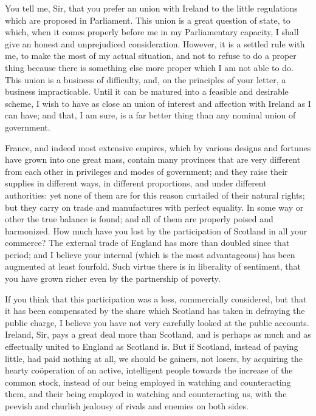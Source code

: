 You tell me, Sir, that you prefer an union with Ireland to the little regulations which are proposed in Parliament. This union is a great question of state, to which, when it comes properly before me in my Parliamentary capacity, I shall give an honest and unprejudiced consideration. However, it is a settled rule with me, to make the most of my actual situation, and not to refuse to do a proper thing because there is something else more proper which I am not able to do. This union is a business of difficulty, and, on the principles of your letter, a business impracticable. Until it can be matured into a feasible and desirable scheme, I wish to have as close an union of interest and affection with Ireland as I can have; and that, I am sure, is a far better thing than any nominal union of government.

France, and indeed most extensive empires, which by various designs and fortunes have grown into one great mass, contain many provinces that are very different from each other in privileges and modes of government; and they raise their supplies in different ways, in different proportions, and under different authorities: yet none of them are for this reason curtailed of their natural rights; but they carry on trade and manufactures with perfect equality. In some way or other the true balance is found; and all of them are properly poised and harmonized. How much have you lost by the participation of Scotland in all your commerce? The external trade of England has more than doubled since that period; and I believe your internal (which is the most advantageous) has been augmented at least fourfold. Such virtue there is in liberality of sentiment, that you have grown richer even by the partnership of poverty.

If you think that this participation was a loss, commercially considered, but that it has been compensated by the share which Scotland has taken in defraying the public charge, I believe you have not very carefully looked at the public accounts. Ireland, Sir, pays a great deal more than Scotland, and is perhaps as much and as effectually united to England as Scotland is. But if Scotland, instead of paying little, had paid nothing at all, we should be gainers, not losers, by acquiring the hearty coöperation of an active, intelligent people towards the increase of the common stock, instead of our being employed in watching and counteracting them, and their being employed in watching and counteracting us, with the peevish and churlish jealousy of rivals and enemies on both sides.

